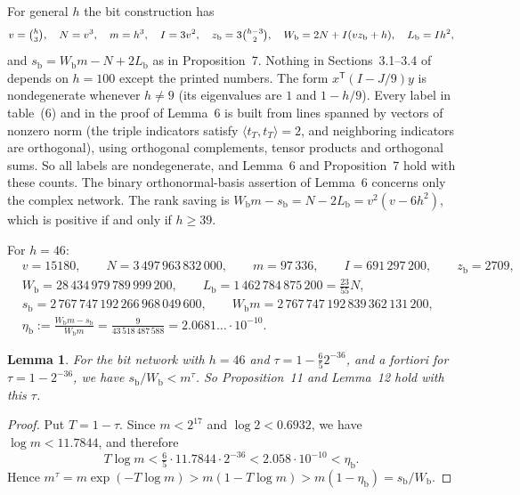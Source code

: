 \documentclass[11pt]{article}
\numberwithin{equation}{section}
\numberwithin{table}{section}
\newtheorem{lemma}[theorem]{Lemma}
\theoremstyle{remark}
\newcommand{\OAI}{\cite{OAI}}
\newcommand{\Wb}{W_{\mathrm b}}
\newcommand{\sbb}{s_{\mathrm b}}
\newcommand{\Lb}{L_{\mathrm b}}
\newcommand{\zb}{z_{\mathrm b}}
\newcommand{\etab}{\eta_{\mathrm b}}
\begin{document}
For general $h$ the bit construction has
\[
 v=\tbinom h3,\quad N=v^3,\quad m=h^3,\quad I=3v^2,\quad
 \zb=3\tbinom{h-3}{2},\quad \Wb=2N+I(v\zb+h),\quad \Lb=Ih^2,
\]
and $\sbb=\Wb m-N+2\Lb$ as in Proposition~7. Nothing in Sections~3.1--3.4
of \OAI{} depends on $h=100$ except the printed numbers. The form
$x^{\mathsf T}(I-J/9)y$ is nondegenerate whenever $h\ne9$ (its
eigenvalues are $1$ and $1-h/9$). Every label in table~(6) and in the
proof of Lemma~6 is built from lines spanned by vectors of nonzero norm
(the triple indicators satisfy $\langle t_T,t_T\rangle=2$, and
neighboring indicators are orthogonal), using orthogonal complements,
tensor products and orthogonal sums. So all labels are nondegenerate,
and Lemma~6 and Proposition~7 hold with these counts. The binary
orthonormal-basis assertion of Lemma~6 concerns only the complex
network. The rank saving is $\Wb m-\sbb=N-2\Lb=v^2(v-6h^2)$, which is
positive if and only if $h\ge39$.

For $h=46$:
\[
\begin{aligned}
 &v=15180,\qquad N=3\,497\,963\,832\,000,\qquad m=97\,336,\qquad
  I=691\,297\,200,\qquad \zb=2709,\\
 &\Wb=28\,434\,979\,789\,999\,200,\qquad
  \Lb=1\,462\,784\,875\,200=\tfrac{23}{55}N,\\
 &\sbb=2\,767\,747\,192\,266\,968\,049\,600,\qquad
  \Wb m=2\,767\,747\,192\,839\,362\,131\,200,\\
 &\etab:=\frac{\Wb m-\sbb}{\Wb m}=\frac{9}{43\,518\,487\,588}
  =2.0681\ldots\cdot10^{-10}.
\end{aligned}
\]

\begin{lemma}\label{lem:tau}
For the bit network with $h=46$ and $\tau=1-\tfrac65 2^{-36}$, and
\emph{a fortiori} for $\tau=1-2^{-36}$, we have $\sbb/\Wb<m^\tau$. So
Proposition~11 and Lemma~12 hold with this $\tau$.
\end{lemma}

\begin{proof}
Put $T=1-\tau$. Since $m<2^{17}$ and $\log2<0.6932$, we have $\log
m<11.7844$, and therefore
\[
 T\log m<\tfrac65\cdot11.7844\cdot2^{-36}<2.058\cdot10^{-10}<\etab.
\]
Hence $m^\tau=m\exp(-T\log m)>m(1-T\log m)>m(1-\etab)=\sbb/\Wb$.
\end{proof}
\end{document}
